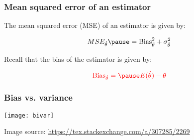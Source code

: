 \documentclass[smaller]{beamer}
\newcommand{\?}{\stackrel{?}{=}}
\newcommand{\rd}{\color{red}}
\begin{document}
\begin{frame}
  \frametitle{Mean squared error of an estimator}
  \pause

  The mean squared error (MSE) of an estimator is given by:

  \pause

  \begin{equation}
    MSE_{\hat\theta} \pause = \text{Bias}_{\hat\theta}^{2} + \sigma_{\hat\theta}^{2}
  \end{equation}

  \pause

  Recall that the bias of the estimator is given by: \pause

  \begin{equation}
    \label{eq:2}\rd
    \text{Bias}_{\hat\theta} = \pause  E(\hat\theta) - \theta
  \end{equation}
   
\end{frame}

\begin{frame}
  \frametitle{Bias vs. variance}

  \pause

  \begin{center}
    \texttt{[image: bivar]}
  \end{center}

{\footnotesize Image source: \url{https://tex.stackexchange.com/a/307285/2269}}
\end{frame}
\end{document}
